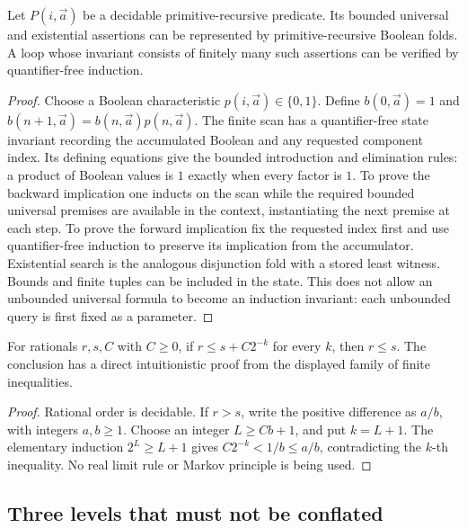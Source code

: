 \begin{lemma}
\label{lem:boolean}
Let \(P(i,\vec a)\) be a decidable primitive-recursive predicate. Its bounded
universal and existential assertions can be represented by primitive-recursive
Boolean folds. A loop whose invariant consists of finitely many such assertions
can be verified by quantifier-free induction.
\end{lemma}
\begin{proof}
Choose a Boolean characteristic \(p(i,\vec a)\in\{0,1\}\). Define
\(b(0,\vec a)=1\) and
\(b(n+1,\vec a)=b(n,\vec a)p(n,\vec a)\).
The finite scan has a quantifier-free state invariant recording the accumulated
Boolean and any requested component index. Its defining equations give the
bounded introduction and elimination rules: a product of Boolean values is
\(1\) exactly when every factor is \(1\). To prove the backward implication
one inducts on the scan while the required bounded universal premises are
available in the context, instantiating the next premise at each step.
To prove the forward implication fix the requested index first and use
quantifier-free induction to preserve its implication from the accumulator.
Existential search is the analogous disjunction fold with a stored least
witness. Bounds and finite tuples can be included in the state.
This does not allow an unbounded universal formula to become an induction
invariant: each unbounded query is first fixed as a parameter.
\end{proof}

\begin{lemma}
\label{lem:separation}
For rationals \(r,s,C\) with \(C\geq0\), if
\(r\leq s+C2^{-k}\) for every \(k\), then \(r\leq s\).
The conclusion has a direct intuitionistic proof from the displayed family
of finite inequalities.
\end{lemma}
\begin{proof}
Rational order is decidable. If \(r>s\), write the positive difference as
\(a/b\), with integers \(a,b\geq1\). Choose an integer \(L\geq Cb+1\), and
put \(k=L+1\). The elementary induction \(2^L\geq L+1\) gives
\(C2^{-k}<1/b\leq a/b\), contradicting the \(k\)-th inequality. No real
limit rule or Markov principle is being used.
\end{proof}

\subsection{Three levels that must not be conflated}

